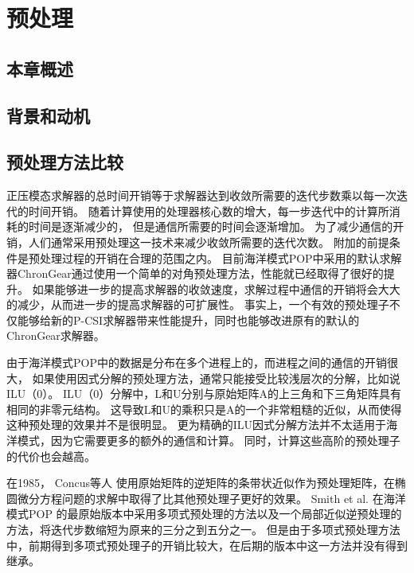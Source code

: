 \chapter{预处理}
\label{cha:precond}

\section{本章概述}

\section{背景和动机}
\label{sec:precondBackgroud}

\section{预处理方法比较}
\label{sec:precond1}
正压模态求解器的总时间开销等于求解器达到收敛所需要的迭代步数乘以每一次迭代的时间开销。
随着计算使用的处理器核心数的增大，每一步迭代中的计算所消耗的时间是逐渐减少的，
但是通信所需要的时间会逐渐增加。 
为了减少通信的开销，人们通常采用预处理这一技术来减少收敛所需要的迭代次数。
附加的前提条件是预处理过程的开销在合理的范围之内。 
目前海洋模式POP中采用的默认求解器ChronGear通过使用一个简单的对角预处理方法，性能就已经取得了很好的提升\cite{pini1990simple, reddy2013comparison}。 
如果能够进一步的提高求解器的收敛速度，求解过程中通信的开销将会大大的减少，从而进一步的提高求解器的可扩展性。
事实上，一个有效的预处理子不仅能够给新的P-CSI求解器带来性能提升，同时也能够改进原有的默认的ChronGear求解器。

由于海洋模式POP中的数据是分布在多个进程上的，而进程之间的通信的开销很大， 如果使用因式分解的预处理方法，通常只能接受比较浅层次的分解，比如说ILU（0）。 
ILU（0）分解中，L和U分别与原始矩阵A的上三角和下三角矩阵具有相同的非零元结构。
这导致L和U的乘积只是A的一个非常粗糙的近似，从而使得这种预处理的效果并不是很明显。 
更为精确的ILU因式分解方法并不太适用于海洋模式，因为它需要更多的额外的通信和计算。 
同时，计算这些高阶的预处理子的代价也会越高。 

在1985， Concus等人 \cite{concus1985block} 使用原始矩阵的逆矩阵的条带状近似作为预处理矩阵，在椭圆微分方程问题的求解中取得了比其他预处理子更好的效果。 
Smith et al. \cite{smith1992parallel}在海洋模式POP 的最原始版本中采用多项式预处理的方法以及一个局部近似逆预处理的方法，将迭代步数缩短为原来的三分之到五分之一。
但是由于多项式预处理方法中，前期得到多项式预处理子的开销比较大，在后期的版本中这一方法并没有得到继承。  

